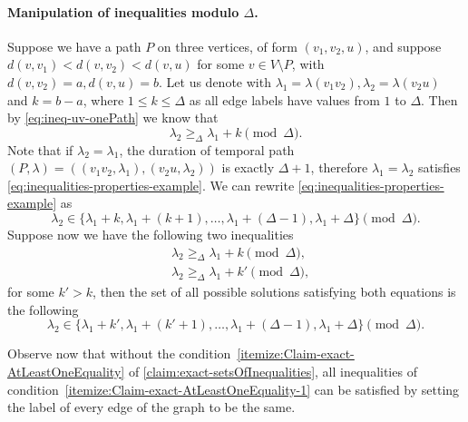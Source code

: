 \documentclass[11pt,a4paper]{article}
\theoremstyle{remark}
\theoremstyle{definition}
\begin{document}
    
    \paragraph{Manipulation of inequalities modulo $\Delta$.}
    Suppose we have a path $P$ on three vertices, of form $(v_1, v_2, u)$,
    and suppose $d(v,v_1) < d(v,v_2) < d(v,u)$ for some $v \in V \setminus P$, with $d(v,v_2) = a, d(v,u)=b$. 
    Let us denote with $\lambda_1 = \lambda(v_1 v_2), \lambda_2 = \lambda(v_2 u)$ and $k = b-a$, where $1 \leq k \leq \Delta$ as all edge labels have values from $1$ to $\Delta$.
    Then by \cref{eq:ineq-uv-onePath} we know that 
    \begin{equation}\label{eq:inequalities-properties-example}
        \lambda_2 \geq_\Delta \lambda_1 + k \pmod \Delta.
    \end{equation}
    Note that if $\lambda_2 = \lambda_1$, the duration of temporal path $(P, \lambda) = ((v_1v_2, \lambda_1), (v_2u, \lambda_2))$ is exactly $\Delta+1$,
    therefore $\lambda_1 = \lambda_2$ satisfies \cref{eq:inequalities-properties-example}.
    We can rewrite \cref{eq:inequalities-properties-example} as
    \begin{equation*}
        \lambda_2 \in 
        \{
        \lambda_1 + k, \lambda_1 + (k + 1), \dots , \lambda_1 + (\Delta - 1), \lambda_1 + \Delta 
        \} \pmod \Delta.
    \end{equation*}
    Suppose now we have the following two inequalities
    \begin{align*}
        & \lambda_2 \geq_\Delta \lambda_1 + k \pmod \Delta, \\
        & \lambda_2 \geq_\Delta \lambda_1 + k' \pmod \Delta,
    \end{align*}
    for some $k' > k$, then the set of all possible solutions satisfying both equations is the following
        \begin{equation*}
        \lambda_2 \in 
        \{
        \lambda_1 + k', \lambda_1 + (k' + 1), \dots , \lambda_1 + (\Delta - 1), \lambda_1 + \Delta 
        \} \pmod \Delta.
    \end{equation*}
    
    Observe now that without the condition~\ref{itemize:Claim-exact-AtLeastOneEquality} of \cref{claim:exact-setsOfInequalities}, all inequalities of condition~\ref{itemize:Claim-exact-AtLeastOneEquality-1} can be satisfied by setting the label of every edge of the graph to be the same.
    
\end{document}

